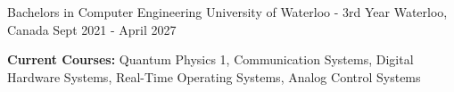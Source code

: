 

\begin{cventries}

	\cventry
	{Bachelors in Computer Engineering} %
	{University of Waterloo - 3rd Year} %
	{Waterloo, Canada} %
	{Sept 2021 - April 2027} %
	{
		\begin{cvitems} %
			\item {\textbf{Current Courses:} Quantum Physics 1, Communication Systems, Digital Hardware Systems, Real-Time Operating Systems, Analog Control Systems}
		\end{cvitems}
	}

\end{cventries}
